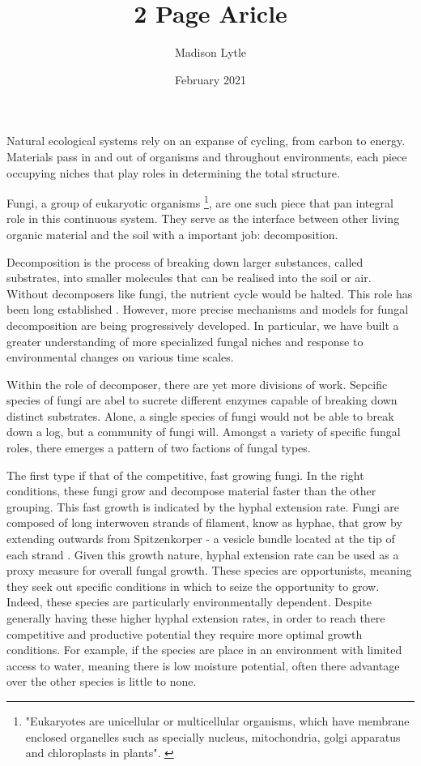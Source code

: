 \documentclass{article}
\title{2 Page Aricle}
\author{Madison Lytle}
\date{February 2021}
\begin{document}

Natural ecological systems rely on an expanse of cycling, from carbon to energy. Materials pass in and out of organisms and throughout environments, each piece occupying niches that play roles in determining the total structure.

Fungi, a group of eukaryotic organisms \footnote{"Eukaryotes are unicellular or multicellular organisms, which have membrane enclosed organelles such as specially nucleus, mitochondria, golgi apparatus and chloroplasts in plants". \cite{Lakna2017}}, are one such piece that p\hold an integral role in this continuous system. They serve as the interface between other living organic material and the soil with a important job: decomposition.

Decomposition is the process of breaking down larger substances, called substrates, into smaller molecules that can be realised into the soil or air. Without decomposers like fungi, the nutrient cycle would be halted. This role has been long established \cite{Kakde2009}. However, more precise mechanisms and models for fungal decomposition are being progressively developed. In particular, we have built a greater understanding of more specialized fungal niches and response to environmental changes on various time scales.

Within the role of decomposer, there are yet more divisions of work. Sepcific species of fungi are abel to sucrete different enzymes capable of breaking down distinct substrates. Alone, a single species of fungi would not be able to break down a log, but a community of fungi will. Amongst a variety of specific fungal roles, there emerges a pattern of two factions of fungal types. %

The first type if that of the competitive, fast growing fungi. In the right conditions, these fungi grow and decompose material faster than the other grouping. This fast growth is indicated by the hyphal extension rate. Fungi are composed of long interwoven strands of filament, know as hyphae, that grow by extending outwards from Spitzenkorper - a vesicle bundle located at the tip of each strand \cite{Edelstein1982}. Given this growth nature, hyphal extension rate can be used as a proxy measure for overall fungal growth. These species are opportunists, meaning they seek out specific conditions in which to seize the opportunity to grow. Indeed, these species are particularly environmentally dependent. Despite generally having these higher hyphal extension rates, in order to reach there competitive and productive potential they require more optimal growth conditions. For example, if the species are place in an environment with limited access to water, meaning there is low moisture potential, often there advantage over the other species is little to none.
\end{document}
